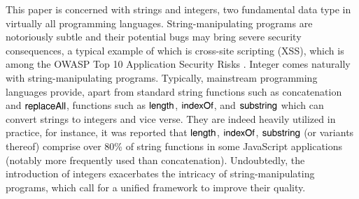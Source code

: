 
This paper is concerned with strings and integers, two fundamental data type
in virtually all programming languages.
String-manipulating programs are notoriously subtle and their potential bugs %
may bring severe security consequences, a typical example of which is cross-site scripting
(XSS), which is among the OWASP Top 10 Application Security Risks
\cite{owasp17}. Integer  %
comes naturally with string-manipulating programs. %
Typically, mainstream programming languages provide, apart from standard string functions such as concatenation and $\mathsf{replaceAll}$, %
functions such as $\mathsf{length}$, $\mathsf{indexOf}$, and $\mathsf{substring}$ which can convert strings to integers and vice verse. %
They are indeed heavily utilized in practice, for instance, it was reported \cite{Berkeley-JavaScript} that $\mathsf{length}$, $\mathsf{indexOf}$, $\mathsf{substring}$ (or variants thereof) comprise over 80\% of string functions in some JavaScript applications (notably more frequently used than concatenation). Undoubtedly, the introduction of integers exacerbates the intricacy of string-manipulating programs, which call for a unified framework to improve their quality. 







